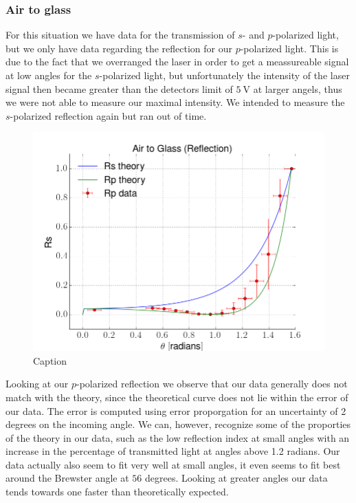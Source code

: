\subsubsection{Air to glass}
For this situation we have data for the transmission of $s$- and $p$-polarized light, but we only have data regarding the reflection for our $p$-polarized light. This is due to the fact that we overranged the laser in order to get a meassureable signal at low angles for the $s$-polarized light, but unfortunately the intensity of the laser signal then became greater than the detectors limit of $\SI{5}{\volt}$ at larger angels, thus we were not able to measure our maximal intensity. We intended to measure the $s$-polarized reflection again but ran out of time.\\

\begin{figure}[h!]
    \centering
    \includegraphics[width=\columnwidth]{pr1}
    \caption{Caption}
    \label{fig:pr1}
\end{figure}

Looking at our $p$-polarized reflection we observe that our data generally does not match with the theory, since the theoretical curve does not lie within the error of our data. The error is computed using error proporgation for an uncertainty of 2 degrees on the incoming angle. We can, however, recognize some of the proporties of the theory in our data, such as the low reflection index at small angles with an increase in the percentage of transmitted light at angles above 1.2 radians. Our data actually also seem to fit very well at small angles, it even seems to fit best around the Brewster angle at $56$ degrees. Looking at greater angles our data tends towards one faster than theoretically expected. 

